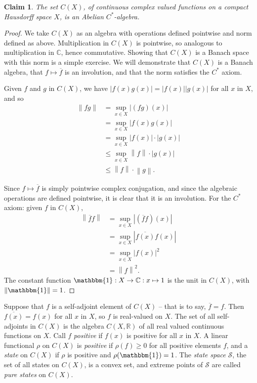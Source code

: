 \documentclass[11pt,a4paper]{report}
\theoremstyle{plain}
\newtheorem*{claim}{Claim}
\theoremstyle{definition}
\newcommand{\1}{\mathbbm{1}}
\newcommand{\C}{\mathbb{C}}
\newcommand{\R}{\mathbb{R}}
\newcommand{\CX}{C(X)}
\renewcommand{\S}{\mathscr{S}}
\renewcommand{\bar}{\overline}
\begin{document}
\begin{claim}
	The set $\CX$, of continuous complex valued functions on a compact Hausdorff 
	space $X$, is an Abelian $C^\ast$-algebra.
\end{claim}
\begin{proof}
	We take $\CX$ as an algebra with operations defined pointwise and norm defined 
	as above. Multiplication in $\CX$ is pointwise, so analogous to multiplication 
	in $\C$, hence commutative. Showing that $\CX$ is a Banach space with this norm 
	is a simple exercise. We will demonstrate that $\CX$ is a Banach algebra, that 
	$f\mapsto\overline{f}$ is an involution, and that the norm satisfies the 
	$C^\ast$ axiom.
	
	Given $f$ and $g$ in $\CX$, we have $\left|f(x)g(x)\right| = 
	\left|f(x)\right|\left|g(x)\right|$ for all $x$ in $X$, and so 
	\begin{align*}
				\left\|fg\right\| 
		&= 		\sup_{x\in X}|(fg)(x)|														\\
		&= 		\sup_{x\in X}|f(x)g(x)|														\\
		&=		\sup_{x\in X}|f(x)|\cdot|g(x)|												\\
		&\leq	\sup_{x\in X}\left\|f\right\|\cdot|g(x)|									\\
		&\leq	\left\|f\right\|\cdot \left\|g\right\|.
	\end{align*}
	
	Since $f\mapsto\overline{f}$ is simply pointwise complex conjugation, and since the 
	algebraic operations are defined pointwise, it is clear that it is an 
	involution. For the $C^\ast$ axiom: given $f$ in $\CX$,
	\begin{align*}
				\left\|\bar f f\right\| 
		&= 		\sup_{x\in X}|(\bar f f)(x)|												\\
		&= 		\sup_{x\in X}|\bar{f(x)} f(x)|												\\
		&=		\sup_{x\in X}|f(x)|^2														\\
		&=		\left\|f\right\|^2.
	\end{align*}
	The constant function $\1:X\to\C:x\mapsto 1$ is the unit in $\CX$, 
	with $\left\|\1\right\| = 1$.
\end{proof}

Suppose that $f$ is a self-adjoint element of $\CX$ -- that is to say, $\bar f = 
f$. Then~$\bar{f(x)} = f(x)$ for all $x$ in $X$, so $f$ is real-valued on $X$. 
The set of all self-adjoints in $\CX$ is the algebra $C(X,\R)$ of all real 
valued continuous functions on $X$. Call $f$ \emph{positive} if $f(x)$ is 
positive for all $x$ in $X$. 
A linear functional $\rho$ on $\CX$ is \emph{positive} if $\rho(f)\geq 0$ for 
all positive elements $f$, and a \emph{state} on $\CX$ if $\rho$ is positive and 
$\rho(\1)=1$. The \emph{state space} $\S$, the set of all states on $\CX$, is a 
convex set, and extreme points of $\S$ are called \emph{pure states} on $\CX$.
\end{document}
